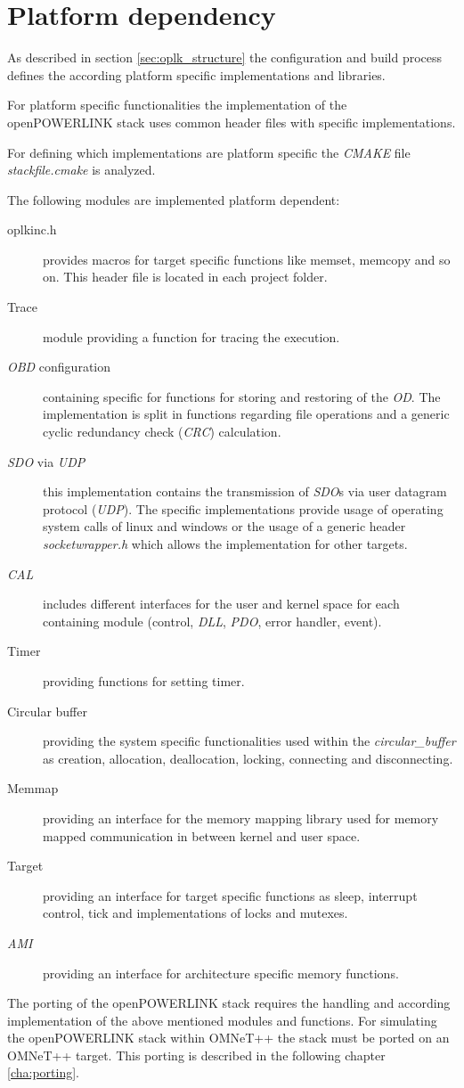 \section{Platform dependency}
\label{sec:oplk_platform}

As described in section \ref{sec:oplk_structure} the configuration and build process defines the according platform specific implementations and libraries.

For platform specific functionalities the implementation of the openPOWERLINK stack uses common header files with specific implementations.

For defining which implementations are platform specific the \emph{CMAKE} file \emph{stackfile.cmake} is analyzed.

The following modules are implemented platform dependent:

\begin{description}
    \item[oplkinc.h] provides macros for target specific functions like memset, memcopy and so on.
    This header file is located in each project folder.
    \item[Trace] module providing a function for tracing the execution.
    \item[\emph{OBD} configuration] containing specific for functions for storing and restoring of the \emph{OD}.
    The implementation is split in functions regarding file operations and a generic cyclic redundancy check (\emph{CRC}) calculation.
    \item[\emph{SDO} via \emph{UDP}] this implementation contains the transmission of \emph{SDO}s via user datagram protocol (\emph{UDP}).
    The specific implementations provide usage of operating system calls of linux and windows or the usage of a generic header \emph{socketwrapper.h} which allows the implementation for other targets.
    \item[\emph{CAL}] includes different interfaces for the user and kernel space for each containing module (control, \emph{DLL}, \emph{PDO}, error handler, event).
    \item[Timer] providing functions for setting timer.
    \item[Circular buffer] providing the system specific functionalities used within the \emph{circular\_buffer} as creation, allocation, deallocation, locking, connecting and disconnecting.
    \item[Memmap] providing an interface for the memory mapping library used for memory mapped communication in between kernel and user space.
    \item[Target] providing an interface for target specific functions as sleep, interrupt control, tick and implementations of locks and mutexes.
    \item[\emph{AMI}] providing an interface for architecture specific memory functions.
\end{description}

The porting of the openPOWERLINK stack requires the handling and according implementation of the above mentioned modules and functions.
For simulating the openPOWERLINK stack within OMNeT++ the stack must be ported on an OMNeT++ target.
This porting is described in the following chapter \ref{cha:porting}.